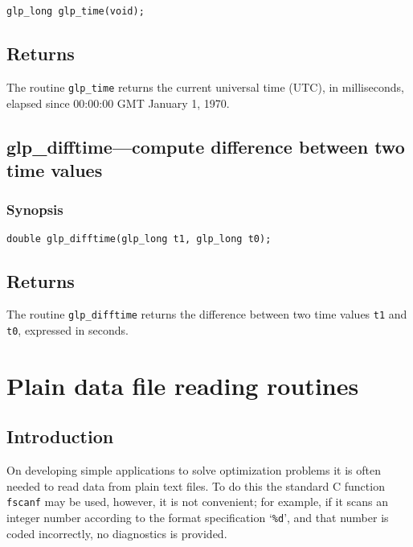 \begin{verbatim}
glp_long glp_time(void);
\end{verbatim}

\subsection*{Returns}

The routine \verb|glp_time| returns the current universal time (UTC),
in milliseconds, elapsed since 00:00:00 GMT January 1, 1970.

\subsection{glp\_difftime---compute difference between two time values}

\subsubsection*{Synopsis}

\begin{verbatim}
double glp_difftime(glp_long t1, glp_long t0);
\end{verbatim}

\subsection*{Returns}

The routine \verb|glp_difftime| returns the difference between two time
values \verb|t1| and \verb|t0|, expressed in seconds.


\newpage

\section{Plain data file reading routines}

\subsection{Introduction}

On developing simple applications to solve optimization problems it is
often needed to read data from plain text files. To do this the standard
C function \verb|fscanf| may be used, however, it is not convenient; for
example, if it scans an integer number according to the format
specification `\verb|%d|', and that number is coded incorrectly,
no diagnostics is provided.

